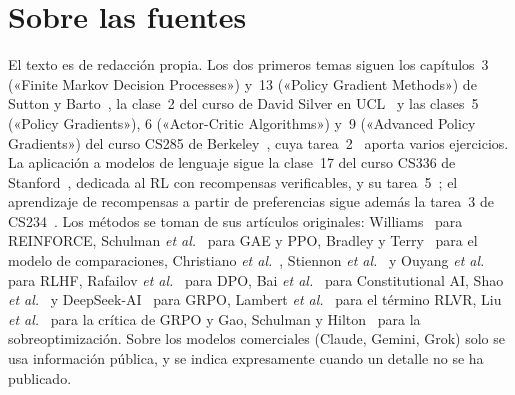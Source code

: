 \documentclass[11pt,a4paper,twoside,openany]{book}
\begin{document}
\section*{Sobre las fuentes}
El texto es de redacción propia. Los dos primeros temas siguen los capítulos~3 («Finite Markov Decision Processes») y~13 («Policy Gradient Methods») de Sutton y Barto~\cite{sb}, la clase~2 del curso de David Silver en UCL~\cite{silver} y las clases~5 («Policy Gradients»), 6 («Actor-Critic Algorithms») y~9 («Advanced Policy Gradients») del curso CS285 de Berkeley~\cite{cs285}, cuya tarea~2~\cite{cs285hw2} aporta varios ejercicios. La aplicación a modelos de lenguaje sigue la clase~17 del curso CS336 de Stanford~\cite{cs336}, dedicada al RL con recompensas verificables, y su tarea~5~\cite{cs336a5,cs336a5s}; el aprendizaje de recompensas a partir de preferencias sigue además la tarea~3 de CS234~\cite{cs234a3}. Los métodos se toman de sus artículos originales: Williams~\cite{williams} para REINFORCE, Schulman \emph{et al.}~\cite{gae,ppo} para GAE y PPO, Bradley y Terry~\cite{bt} para el modelo de comparaciones, Christiano \emph{et al.}~\cite{christiano}, Stiennon \emph{et al.}~\cite{stiennon} y Ouyang \emph{et al.}~\cite{instructgpt} para RLHF, Rafailov \emph{et al.}~\cite{dpo} para DPO, Bai \emph{et al.}~\cite{cai} para Constitutional AI, Shao \emph{et al.}~\cite{deepseekmath} y DeepSeek-AI~\cite{r1} para GRPO, Lambert \emph{et al.}~\cite{tulu3} para el término RLVR, Liu \emph{et al.}~\cite{drgrpo} para la crítica de GRPO y Gao, Schulman y Hilton~\cite{gao} para la sobreoptimización. Sobre los modelos comerciales (Claude, Gemini, Grok) solo se usa información pública, y se indica expresamente cuando un detalle no se ha publicado.
\end{document}

